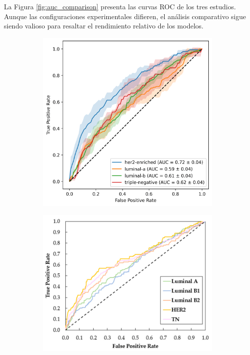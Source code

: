 \documentclass[a4paper,10pt]{book}
\begin{document}
La Figura \ref{fig:auc_comparison} presenta las curvas ROC de los tres estudios. Aunque las configuraciones experimentales difieren, el análisis comparativo sigue siendo valioso para resaltar el rendimiento relativo de los modelos.


\begin{figure}[h!]
    \centering
    \begin{subfigure}[t]{0.32\textwidth}
        \centering
        \includegraphics[width=\textwidth]{reports/assets/MEAN_AUC_Vit.png}
        \caption{}
        \label{fig:mean_auc_vit_final}
    \end{subfigure}
    \begin{subfigure}[t]{0.32\textwidth}
        \centering
        \includegraphics[width=\textwidth]{reports/assets/MotaMulticlass.png}

\end{subfigure}
\end{figure}
\end{document}
